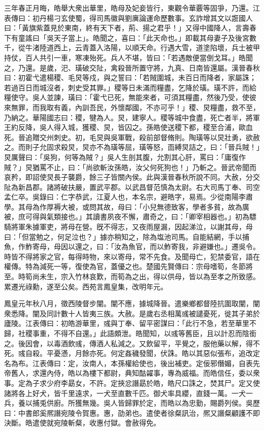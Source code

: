 \begin{pinyinscope}
三年春正月晦，皓舉大衆出華里，皓母及妃妾皆行，東觀令華覈等固爭，乃還。江表傳曰：初丹楊刁玄使蜀，得司馬徽與劉廙論運命歷數事。玄詐增其文以誑國人曰：「黃旗紫蓋見於東南，終有天下者，荊、揚之君乎！」又得中國降人，言壽春下有童謠曰「吳天子當上」。皓聞之，喜曰：「此天命也。」即載其母妻子及後宮數千，從牛渚陸道西上，云青蓋入洛陽，以順天命。行遇大雪，道塗陷壞，兵士被甲持仗，百人共引一車，寒凍殆死。兵人不堪，皆曰：「若遇敵便當倒戈耳。」皓聞之，乃還。是歲，汜、璜破交阯，禽殺晉所置守將，九真、日南皆還屬。漢晉春秋曰：初霍弋遣楊稷、毛炅等戍，與之誓曰：「若賊圍城，未百日而降者，家屬誅；若過百日而城沒者，刺史受其罪。」稷等日未滿而糧盡，乞降於璜。璜不許，而給糧使守。吳人並諫，璜曰：「霍弋已死，無能來者，可須其糧盡，然後乃受，使彼來無罪，而我取有義，內訓吾民，外懷鄰國，不亦可乎！」稷、炅糧盡，救不至，乃納之。華陽國志曰：稷，犍為人。炅，建寧人。稷等城中食盡，死亡者半，將軍王約反降，吳人得入城，獲稷、炅，皆囚之。孫皓使送稷下都，稷至合浦，歐血死。晉追贈交州刺史。初，毛炅與吳軍戰，殺前部督脩則。陶璜等以炅壯勇，欲赦之。而則子允固求殺炅，炅亦不為璜等屈，璜等怒，靣縛炅詰之，曰：「晉兵賊！」炅厲聲曰：「吳狗，何等為賊？」吳人生剖其腹，允割其心肝，罵曰：「庸復作賊？」炅猶罵不止，曰：「尚欲斬汝孫皓，汝父何死狗也！」乃斬之。晉武帝聞而哀矜，即詔使炅長子襲爵，餘三子皆關內侯。此與漢晉春秋所說不同。大赦，分交阯為新昌郡。諸將破扶嚴，置武平郡。以武昌督范慎為太尉。右大司馬丁奉、司空孟仁卒。吳錄曰：仁字恭武，江夏人也，本名宗，避皓字，易焉。少從南陽李肅學。其母為作厚褥大被，或問其故，母曰：「小兒無德致客，學者多貧，故為廣被，庶可得與氣類接也。」其讀書夙夜不懈，肅奇之，曰：「卿宰相器也。」初為驃騎將軍朱據軍吏，將母在營。旣不得志，又夜雨屋漏，因起涕泣，以謝其母，母曰：「但當勉之，何足泣也？」據亦稍知之，除為塩池司馬。自能結網，手以捕魚，作鮓寄母，母因以還之，曰：「汝為魚官，而以鮓寄我，非避嫌也。」遷吳令。時皆不得將家之官，每得時物，來以寄母，常不先食。及聞母亡，犯禁委官，語在權傳。特為減死一等，復使為官，蓋優之也。楚國先賢傳曰：宗母嗜筍，冬節將至。時筍尚未生，宗入竹林哀歎，而筍為之出，得以供母，皆以為至孝之所致感。累遷光祿勳，遂至公矣。西苑言鳳皇集，改明年元。

鳳皇元年秋八月，徵西陵督步闡。闡不應，據城降晉。遣樂鄉都督陸抗圍取闡，闡衆悉降。闡及同計數十人皆夷三族。大赦。是歲右丞相萬彧被譴憂死，徙其子弟於廬陵。江表傳曰：初皓游華里，彧與丁奉、留平密謀曰：「此行不急，若至華里不歸，社稷事重，不得不自還。」此語頗泄。皓聞知，以彧等舊臣，且以計忍而陰銜之。後因會，以毒酒飲彧，傳酒人私減之。又飲留平，平覺之，服他藥以解，得不死。彧自殺。平憂懣，月餘亦死。何定姦穢發聞，伏誅。皓以其惡似張布，追改定名為布。江表傳曰：定，汝南人，本孫權給使也，後出補吏。定佞邪僭媚，自表先帝舊人，求還內侍，皓以為樓下都尉，典知酤糴事，專為威福。而皓信任，委以衆事。定為子求少府李勗女，不許。定挾忿譖勗於皓，皓尺口誅之，焚其尸。定又使諸將各上好犬，皆千里遠求，一犬至直數千匹。御犬率具纓，直錢一萬。一犬一兵，養以捕兎供廚。所獲無幾。吳人皆歸罪於定，而皓以為忠勤，賜爵列侯。吳歷曰：中書郎奚熈譖宛陵令賀惠。惠，劭弟也。遣使者徐粲訊治，熈又譖粲顧護不即決斷。皓遣使就宛陵斬粲，收惠付獄。會赦得免。


\end{pinyinscope}
